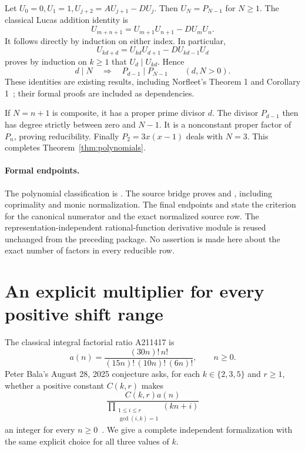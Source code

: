 \documentclass[11pt]{article}
\begin{document}
Let $U_0=0,U_1=1,U_{j+2}=AU_{j+1}-DU_j$. Then $U_N=P_{N-1}$
for $N\ge1$. The classical Lucas addition identity is
\[
U_{m+n+1}=U_{m+1}U_{n+1}-DU_mU_n.
\]
It follows directly by induction on either index. In particular,
\[
U_{kd+d}=U_{kd}U_{d+1}-DU_{kd-1}U_d
\]
proves by induction on $k\ge1$ that $U_d\mid U_{kd}$. Hence
\[
d\mid N\quad\Longrightarrow\quad P_{d-1}\mid P_{N-1}
\qquad(d,N>0).
\]
These identities are existing results, including Norfleet's
Theorem 1 and Corollary 1~\cite{Norfleet}; their formal proofs
are included as dependencies.

If $N=n+1$ is composite, it has a proper prime divisor $d$.
The divisor $P_{d-1}$ then has degree strictly between zero and
$N-1$. It is a nonconstant proper factor of $P_n$, proving
reducibility. Finally $P_2=3x(x-1)$ deals with $N=3$.
This completes Theorem~\ref{thm:polynomials}.

\paragraph{Formal endpoints.}
The polynomial classification is
. The source bridge proves
 and
, including coprimality and monic
normalization. The final endpoints
 and
 state the criterion
for the canonical numerator and the exact normalized source row.
The representation-independent rational-function derivative module
is reused unchanged from the preceding package. No assertion is
made here about the exact number of factors in every reducible row.

\section{An explicit multiplier for every positive shift range}
\label{sec:factorial}

The classical integral factorial ratio A211417 is
\begin{equation}\label{eq:factorial-ratio}
a(n)=\frac{(30n)!\,n!}{(15n)!\,(10n)!\,(6n)!},\qquad n\ge0.
\end{equation}
Peter Bala's August 28, 2025 conjecture asks, for each
$k\in\{2,3,5\}$ and $r\ge1$, whether a positive constant
$C(k,r)$ makes
\[
\frac{C(k,r)a(n)}{
\displaystyle\prod_{\substack{1\le i\le r\\\gcd(i,k)=1}}(kn+i)}
\]
an integer for every $n\ge0$~\cite{A211417}. We give a complete
independent formalization with the same explicit choice for all
three values of $k$.
\end{document}

